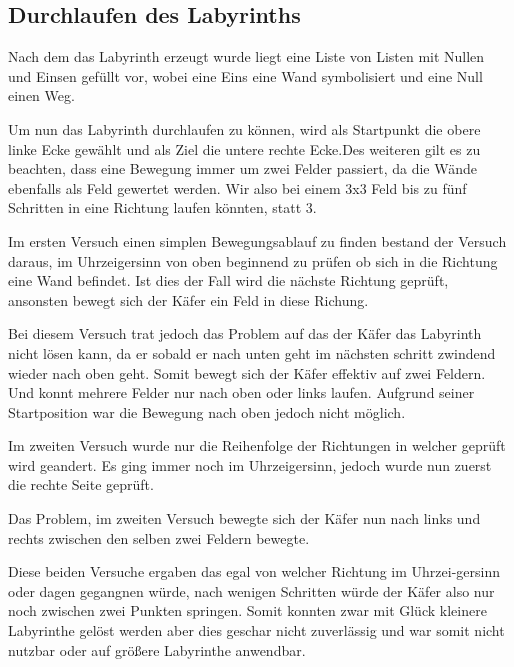 \documentclass[11pt, a4paper]{article}
\begin{document}
\subsection{Durchlaufen des Labyrinths}

Nach dem das Labyrinth erzeugt wurde liegt eine Liste von Listen mit Nullen und Einsen gefüllt vor, wobei eine Eins eine Wand symbolisiert und eine Null einen Weg. 

\bigskip

Um nun das Labyrinth durchlaufen zu können, wird als Startpunkt die obere linke Ecke gewählt und als Ziel die untere rechte Ecke.Des weiteren gilt es zu beachten, dass eine Bewegung immer um zwei Felder passiert, da die Wände ebenfalls als Feld gewertet werden. Wir also bei einem 3x3 Feld bis zu fünf Schritten in eine Richtung laufen könnten, statt 3.

\bigskip

Im ersten Versuch einen simplen Bewegungsablauf zu finden bestand der Versuch daraus, im Uhrzeigersinn von oben beginnend zu prüfen ob sich in die Richtung eine Wand befindet. Ist dies der Fall wird die nächste Richtung geprüft, ansonsten bewegt sich der Käfer ein Feld in diese Richung. 

Bei diesem Versuch trat jedoch das Problem auf das der Käfer das Labyrinth nicht lösen kann, da er sobald er nach unten geht im nächsten schritt zwindend wieder nach oben geht. Somit bewegt sich der Käfer effektiv auf zwei Feldern. Und konnt mehrere Felder nur nach oben oder links laufen. Aufgrund seiner Startposition war die Bewegung nach oben jedoch nicht möglich.

\bigskip

Im zweiten Versuch wurde nur die Reihenfolge der Richtungen in welcher geprüft wird geandert. Es ging immer noch im Uhrzeigersinn, jedoch wurde nun zuerst die rechte Seite geprüft.

Das Problem, im zweiten Versuch bewegte sich der Käfer nun nach links und rechts zwischen den selben zwei Feldern bewegte. 

\bigskip

Diese beiden Versuche ergaben das egal von welcher Richtung im Uhrzei-gersinn oder dagen gegangnen würde, nach wenigen Schritten würde der Käfer also nur noch zwischen zwei Punkten springen. Somit konnten zwar mit Glück kleinere Labyrinthe gelöst werden aber dies geschar nicht zuverlässig und war somit nicht nutzbar oder auf größere Labyrinthe anwendbar.

\bigskip
\end{document}
